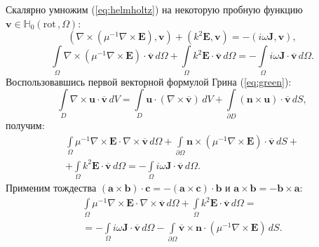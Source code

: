 \documentclass[a4paper,12pt]{article}
\begin{document}
Скалярно умножим (\ref{eq:helmholtz}) на некоторую пробную функцию $\mathbf{v} \in \mathbb{H}_{0}( \mathrm{rot}\,, \Omega )$:
\begin{equation*}
	(\nabla \times ( \mu^{-1} \nabla \times \mathbf{E} ), \mathbf{v}) + (k^{2} \mathbf{E} , \mathbf{v}) = - (i \omega \mathbf{J} , \mathbf{v}) ,
\end{equation*}
\begin{equation*}
	\int\limits_\Omega \nabla \times ( \mu^{-1} \nabla \times \mathbf{E} ) \cdot \overline{\mathbf{v}} \,d\Omega + \int\limits_\Omega k^{2} \mathbf{E} \cdot \overline{\mathbf{v}} \,d\Omega = - \int\limits_\Omega i \omega \mathbf{J} \cdot \overline{\mathbf{v}} \,d\Omega .
\end{equation*}
Воспользовавшись первой векторной формулой Грина (\ref{eq:green}):
\begin{equation}
	\int\limits_D \nabla \times \mathbf{u} \cdot \overline{\mathbf{v}} \,dV = \int\limits_D \mathbf{u} \cdot ( \nabla \times \overline{\mathbf{v}} ) \,dV + \int\limits_{\partial D} (\mathbf{n} \times \mathbf{u}) \cdot \overline{\mathbf{v}} \,dS , \label{eq:green}
\end{equation}
получим:
\begin{equation*}
	\begin{array}{c} { \displaystyle
		\int\limits_\Omega \mu^{-1} \nabla \times \mathbf{E} \cdot \nabla \times \overline{\mathbf{v}} \,d\Omega
		+ \int\limits_{\partial \Omega} \mathbf{n} \times (\mu^{-1} \nabla \times \mathbf{E}) \cdot \overline{\mathbf{v}} \,dS
		+
	} \\ { \displaystyle
		+ \int\limits_\Omega k^{2} \mathbf{E} \cdot \overline{\mathbf{v}} \,d\Omega
		=  - \int\limits_\Omega i \omega \mathbf{J} \cdot \overline{\mathbf{v}} \,d\Omega
		.
	} \end{array}
\end{equation*}
Применим тождества $(\mathbf{a} \times \mathbf{b}) \cdot \mathbf{c} = - (\mathbf{a} \times \mathbf{c}) \cdot \mathbf{b}$ и $\mathbf{a} \times \mathbf{b} = - \mathbf{b} \times \mathbf{a}$:
\begin{equation}
	\begin{array}{c} { \displaystyle
		\int\limits_\Omega \mu^{-1} \nabla \times \mathbf{E} \cdot \nabla \times \overline{\mathbf{v}} \,d\Omega
		+ \int\limits_\Omega k^{2} \mathbf{E} \cdot \overline{\mathbf{v}} \,d\Omega
		=
	} \\ { \displaystyle
		= - \int\limits_\Omega i \omega \mathbf{J} \cdot \overline{\mathbf{v}} \,d\Omega
		- \int\limits_{\partial \Omega} \overline{\mathbf{v}} \times \mathbf{n} \cdot (\mu^{-1} \nabla \times \mathbf{E}) \,dS
	.
	} \end{array}
	\label{eq:form_23}
\end{equation}
\end{document}
